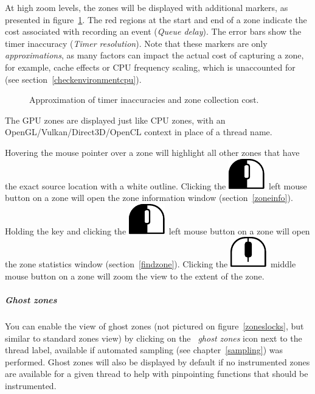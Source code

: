 \documentclass[hidelinks,titlepage,a4paper]{article}
\newcommand{\LMB}{\includegraphics[height=.8\baselineskip]{icons/lmb}}
\newcommand{\MMB}{\includegraphics[height=.8\baselineskip]{icons/mmb}}
\begin{document}
At high zoom levels, the zones will be displayed with additional markers, as presented in figure~\ref{inaccuracy}. The red regions at the start and end of a zone indicate the cost associated with recording an event (\emph{Queue delay}). The error bars show the timer inaccuracy (\emph{Timer resolution}). Note that these markers are only \emph{approximations}, as many factors can impact the actual cost of capturing a zone, for example, cache effects or CPU frequency scaling, which is unaccounted for (see section~\ref{checkenvironmentcpu}).

\begin{figure}[h]
\centering{}
\caption{Approximation of timer inaccuracies and zone collection cost.}
\label{inaccuracy}
\end{figure}

The GPU zones are displayed just like CPU zones, with an OpenGL/Vulkan/Direct3D/OpenCL context in place of a thread name.

Hovering the \faMousePointer{} mouse pointer over a zone will highlight all other zones that have the exact source location with a white outline. Clicking the \LMB{}~left mouse button on a zone will open the zone information window (section~\ref{zoneinfo}). Holding the \keys{\ctrl} key and clicking the \LMB{}~left mouse button on a zone will open the zone statistics window (section~\ref{findzone}). Clicking the \MMB{}~middle mouse button on a zone will zoom the view to the extent of the zone.

\subparagraph{Ghost zones}

You can enable the view of ghost zones (not pictured on figure~\ref{zoneslocks}, but similar to standard zones view) by clicking on the \emph{\faGhost{}~ghost zones} icon next to the thread label, available if automated sampling (see chapter~\ref{sampling}) was performed. Ghost zones will also be displayed by default if no instrumented zones are available for a given thread to help with pinpointing functions that should be instrumented.
\end{document}

